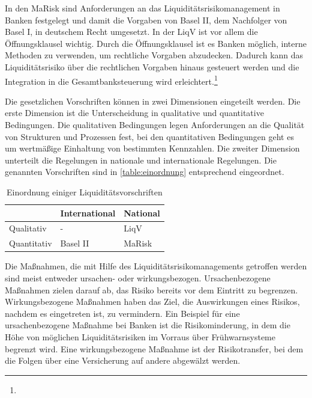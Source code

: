 \begin{onehalfspacing}
In den \gls{MaRisk} sind Anforderungen an das Liquiditätsrisikomanagement in Banken festgelegt und damit die Vorgaben von Basel II, dem Nachfolger von Basel I, in deutschem Recht umgesetzt. In der \gls{LiqV} ist vor allem die Öffnungsklausel wichtig. Durch die Öffnungsklausel ist es Banken möglich, interne Methoden zu verwenden, um rechtliche Vorgaben abzudecken. Dadurch kann das Liquiditätsrisiko über die rechtlichen Vorgaben hinaus gesteuert werden und die Integration in die Gesamtbanksteuerung wird erleichtert.\footnote{ }

Die gesetzlichen Vorschriften können in zwei Dimensionen eingeteilt werden. Die erste Dimension ist die Unterscheidung in qualitative und quantitative Bedingungen. Die qualitativen Bedingungen legen Anforderungen an die Qualität von Strukturen und Prozessen fest, bei den quantitativen Bedingungen geht es um wertmäßige Einhaltung von bestimmten Kennzahlen. Die zweiter Dimension unterteilt die Regelungen in nationale und internationale Regelungen. Die genannten Vorschriften sind in \vref{table:einordnung} entsprechend eingeordnet.

{
\setlength{\extrarowheight}{2pt}
\begin{table}[htbp]
\centering
\begin{tabular}{| l | >{\centering\arraybackslash} m{4cm} | >{\centering\arraybackslash} m{4cm} |}
\cline{2-3}
\multicolumn{1}{l|}{}	& International & National 		\\	\hline
Qualitativ 				& - 			& \gls{LiqV}	\\	\hline
Quantitativ 			& Basel II 		& \gls{MaRisk}	\\	\hline
\end{tabular} 
\caption{Einordnung einiger Liquiditätsvorschriften \label{table:einordnung}}
\end{table}
}

Die Maßnahmen, die mit Hilfe des Liquiditätsrisikomanagements getroffen werden sind meist entweder ursachen- oder wirkungsbezogen. Ursachenbezogene Maßnahmen zielen darauf ab, das Risiko bereits vor dem Eintritt zu begrenzen. Wirkungsbezogene Maßnahmen haben das Ziel, die Auswirkungen eines Risikos, nachdem es eingetreten ist, zu vermindern. Ein Beispiel für eine ursachenbezogene Maßnahme bei Banken ist die Risikominderung, in dem die Höhe von möglichen Liquiditätsrisiken im Vorraus über Frühwarnsysteme begrenzt wird. Eine wirkungsbezogene Maßnahme ist der Risikotransfer, bei dem die Folgen über eine Versicherung auf andere abgewälzt werden.


\end{onehalfspacing}
